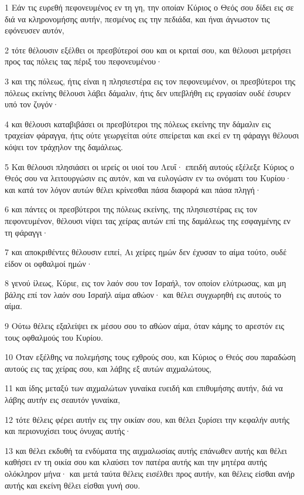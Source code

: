 \par 1 Εάν τις ευρεθή πεφονευμένος εν τη γη, την οποίαν Κύριος ο Θεός σου δίδει εις σε διά να κληρονομήσης αυτήν, πεσμένος εις την πεδιάδα, και ήναι άγνωστον τις εφόνευσεν αυτόν,
\par 2 τότε θέλουσιν εξέλθει οι πρεσβύτεροί σου και οι κριταί σου, και θέλουσι μετρήσει προς τας πόλεις τας πέριξ του πεφονευμένου·
\par 3 και της πόλεως, ήτις είναι η πλησιεστέρα εις τον πεφονευμένον, οι πρεσβύτεροι της πόλεως εκείνης θέλουσι λάβει δάμαλιν, ήτις δεν υπεβλήθη εις εργασίαν ουδέ έσυρεν υπό τον ζυγόν·
\par 4 και θέλουσι καταβιβάσει οι πρεσβύτεροι της πόλεως εκείνης την δάμαλιν εις τραχείαν φάραγγα, ήτις ούτε γεωργείται ούτε σπείρεται και εκεί εν τη φάραγγι θέλουσι κόψει τον τράχηλον της δαμάλεως.
\par 5 Και θέλουσι πλησιάσει οι ιερείς οι υιοί του Λευΐ· επειδή αυτούς εξέλεξε Κύριος ο Θεός σου να λειτουργώσιν εις αυτόν, και να ευλογώσιν εν τω ονόματι του Κυρίου· και κατά τον λόγον αυτών θέλει κρίνεσθαι πάσα διαφορά και πάσα πληγή·
\par 6 και πάντες οι πρεσβύτεροι της πόλεως εκείνης, της πλησιεστέρας εις τον πεφονευμένον, θέλουσι νίψει τας χείρας αυτών επί της δαμάλεως της εσφαγμένης εν τη φάραγγι·
\par 7 και αποκριθέντες θέλουσιν ειπεί, Αι χείρες ημών δεν έχυσαν το αίμα τούτο, ουδέ είδον οι οφθαλμοί ημών·
\par 8 γενού ίλεως, Κύριε, εις τον λαόν σου τον Ισραήλ, τον οποίον ελύτρωσας, και μη βάλης επί τον λαόν σου Ισραήλ αίμα αθώον· και θέλει συγχωρηθή εις αυτούς το αίμα.
\par 9 Ούτω θέλεις εξαλείψει εκ μέσου σου το αθώον αίμα, όταν κάμης το αρεστόν εις τους οφθαλμούς του Κυρίου.
\par 10 Όταν εξέλθης να πολεμήσης τους εχθρούς σου, και Κύριος ο Θεός σου παραδώση αυτούς εις τας χείρας σου, και λάβης εξ αυτών αιχμαλώτους,
\par 11 και ίδης μεταξύ των αιχμαλώτων γυναίκα ευειδή και επιθυμήσης αυτήν, διά να λάβης αυτήν εις σεαυτόν γυναίκα,
\par 12 τότε θέλεις φέρει αυτήν εις την οικίαν σου, και θέλει ξυρίσει την κεφαλήν αυτής και περιονυχίσει τους όνυχας αυτής·
\par 13 και θέλει εκδυθή τα ενδύματα της αιχμαλωσίας αυτής επάνωθεν αυτής και θέλει καθήσει εν τη οικία σου και κλαύσει τον πατέρα αυτής και την μητέρα αυτής ολόκληρον μήνα· και μετά ταύτα θέλεις εισέλθει προς αυτήν, και θέλεις είσθαι ανήρ αυτής και εκείνη θέλει είσθαι γυνή σου.
